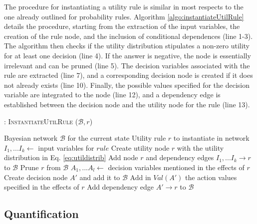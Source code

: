 The procedure for instantiating a utility rule is similar in most respects to the one already outlined for probability rules. Algorithm \ref{algo:instantiateUtilRule} details the procedure, starting from the extraction of the input variables, the creation of the rule node, and the inclusion of conditional dependences (line 1-3). The algorithm then checks if the utility distribution stipulates a non-zero utility for at least one decision (line 4).  If the answer is negative, the node is essentially irrelevant and can be pruned (line 5).  The decision variables associated with the rule are extracted (line 7), and a corresponding decision node is created if it does not already exists (line 10). Finally, the possible values specified for the decision variable are integrated to the node (line 12), and a dependency edge is established between the decision node and the utility node for the rule (line 13). 

\begin{algorithm}[h!]
\caption{: \textsc{InstantiateUtilRule} ($\mathcal{B}, \mathit{r}$)}
\begin{algorithmic}[1] \vspace{1mm}
\REQUIRE Bayesian network $\mathcal{B}$ for the current state
\REQUIRE Utility rule $\mathit{r}$ to instantiate in network  \vspace{1mm}
\STATE $I_1,...I_k \leftarrow $ input variables for $rule$
\STATE Create utility node $r$ with the utility distribution in Eq. \eqref{eq:utildistrib}
\STATE Add node $r$ and dependency edges $I_1,...I_k \rightarrow r$ to $\mathcal{B}$ 
\STATE Prune $r$ from $\mathcal{B}$
\ELSE
\STATE $A_1,...A_l \leftarrow$ decision variables mentioned in the effects of $r$
\STATE Create decision node $A'$ and add it to $\mathcal{B}$
\ENDIF
\STATE Add in $Val(A')$ the action values specified in the effects of $r$
\STATE Add dependency edge $A' \rightarrow r$ to $\mathcal{B}$ 
\ENDFOR
\ENDIF
\end{algorithmic}
\label{algo:instantiateUtilRule}
\end{algorithm}

\subsection{Quantification}
\label{sec:applicationquantif}

